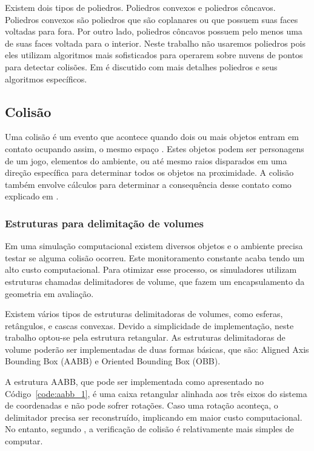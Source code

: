 Existem dois tipos de poliedros. Poliedros convexos e poliedros
côncavos. Poliedros convexos são poliedros que são coplanares ou que possuem
suas faces voltadas para fora. Por outro lado, poliedros côncavos possuem
pelo menos uma de suas faces voltada para o interior.
Neste trabalho não usaremos poliedros pois eles utilizam algoritmos mais
sofisticados para operarem sobre nuvens de pontos para detectar colisões.
Em  é discutido com mais detalhes poliedros e seus algoritmos específicos.

\subsection{Colisão}

Uma colisão é um evento que acontece quando dois ou mais objetos entram em
contato ocupando assim, o mesmo espaço .
Estes objetos podem ser personagens de um jogo, elementos do ambiente, ou até
mesmo raios disparados em uma direção específica para determinar todos os
objetos na proximidade. A colisão também envolve cálculos para determinar a
consequência desse contato como explicado em .

\subsubsection{Estruturas para delimitação de volumes}

Em uma simulação computacional existem diversos objetos e o ambiente precisa testar se alguma colisão ocorreu. Este monitoramento constante acaba tendo um alto custo computacional. Para otimizar esse processo, os simuladores utilizam estruturas chamadas delimitadores de volume, que fazem um encapsulamento da geometria em avaliação.

Existem vários tipos de estruturas delimitadoras de volumes, como esferas, retângulos, e cascas convexas. Devido a simplicidade de implementação, neste trabalho optou-se pela estrutura retangular. As estruturas delimitadoras de volume poderão ser implementadas de duas formas básicas, que são: Aligned Axis Bounding Box (AABB) e Oriented Bounding Box (OBB).

A estrutura AABB, que pode ser implementada como apresentado no Código~\ref{code:aabb_1}, é uma caixa retangular alinhada aos três eixos do sistema de coordenadas e não pode sofrer rotações. Caso uma rotação aconteça, o delimitador precisa ser reconstruído, implicando em maior custo computacional. No entanto, segundo , a verificação de colisão é relativamente mais simples de computar.

